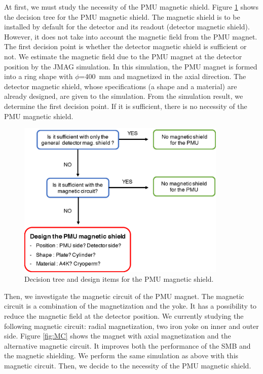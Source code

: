\documentclass[11pt]{article}
\begin{document}
At first, we must study the necessity of the PMU magnetic shield.
Figure \ref{fig:DT} shows the decision tree for the PMU magnetic shield.
The magnetic shield is to be installed by default for the detector and its readout (detector magnetic shield).
However, it does not take into account the magnetic field from the PMU magnet.
The first decision point is whether the detector magnetic shield is sufficient or not.
We estimate the magnetic field due to the PMU magnet at the detector position by the JMAG simulation.
In this simulation,  the PMU magnet is formed into a ring shape with $\phi$=400~mm and magnetized in the axial direction.
The detector magnetic shield, whose specifications (a shape and a material) are already designed, are given to the simulation.
From the simulation result, we determine the first decision point.
If it is sufficient, there is no necessity of the PMU magnetic shield.

\begin{figure}[htbp]
  \centering
  \includegraphics[width=100mm]{figs/MagShieldDecisionTree.eps}
  \caption{Decision tree and design items for the PMU magnetic shield.}
  \label{fig:DT}
\end{figure}

Then, we investigate the magnetic circuit of the PMU magnet.
The magnetic circuit is a combination of the magnetization and the yoke.
It has a possibility to reduce the magnetic field at the detector position.
We currently studying the following magnetic circuit: radial magnetization, two iron yoke on inner and outer side.
Figure \ref{fig:MC} shows the magnet with axial magnetization and the alternative magnetic circuit.
It improves both the performance of the SMB and the magnetic shielding.
We perform the same simulation as above with this magnetic circuit.
Then, we decide to the necessity of the PMU magnetic shield.
\end{document}
